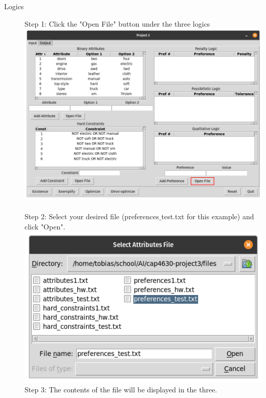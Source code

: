 \documentclass[11pt]{article}
\begin{document}
\begin{description}
\item[Logics] Step 1: Click the "Open File" button under the three logics\\
\includegraphics[scale=0.3]{input_preferences} \\\\
Step 2: Select your desired file (preferences$\_$test.txt for this example) and click "Open".\\
\includegraphics[scale=0.3]{select_preferences}\\
Step 3: The contents of the file will be displayed in the three.\\

\end{description}
\end{document}
